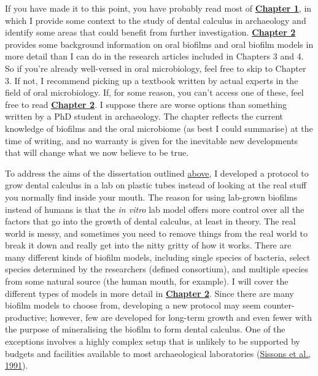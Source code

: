 \documentclass[
  letterpaper,
]{book}
\begin{document}
If you have made it to this point, you have probably read most of
\protect\hyperlink{chap-intro}{\textbf{Chapter 1}}, in which I provide
some context to the study of dental calculus in archaeology and identify
some areas that could benefit from further investigation.
\protect\hyperlink{chap-background}{\textbf{Chapter 2}} provides some
background information on oral biofilms and oral biofilm models in more
detail than I can do in the research articles included in Chapters 3 and
4. So if you're already well-versed in oral microbiology, feel free to
skip to Chapter 3. If not, I recommend picking up a textbook written by
actual experts in the field of oral microbiology. If, for some reason,
you can't access one of these, feel free to read
\protect\hyperlink{chap-background}{\textbf{Chapter 2}}. I suppose there
are worse options than something written by a PhD student in
archaeology. The chapter reflects the current knowledge of biofilms and
the oral microbiome (as best I could summarise) at the time of writing,
and no warranty is given for the inevitable new developments that will
change what we now believe to be true.

To address the aims of the dissertation outlined
\protect\hyperlink{intro-aims}{above}, I developed a protocol to grow
dental calculus in a lab on plastic tubes instead of looking at the real
stuff you normally find inside your mouth. The reason for using
lab-grown biofilms instead of humans is that the \emph{in vitro} lab
model offers more control over all the factors that go into the growth
of dental calculus, at least in theory. The real world is messy, and
sometimes you need to remove things from the real world to break it down
and really get into the nitty gritty of how it works. There are many
different kinds of biofilm models, including single species of bacteria,
select species determined by the researchers (defined consortium), and
multiple species from some natural source (the human mouth, for
example). I will cover the different types of models in more detail in
\protect\hyperlink{background}{\textbf{Chapter 2}}. Since there are many
biofilm models to choose from, developing a new protocol may seem
counter-productive; however, few are developed for long-term growth and
even fewer with the purpose of mineralising the biofilm to form dental
calculus. One of the exceptions involves a highly complex setup that is
unlikely to be supported by budgets and facilities available to most
archaeological laboratories
(\protect\hyperlink{ref-sissonsMultistationPlaque1991}{Sissons et al.,
1991}).
\end{document}
